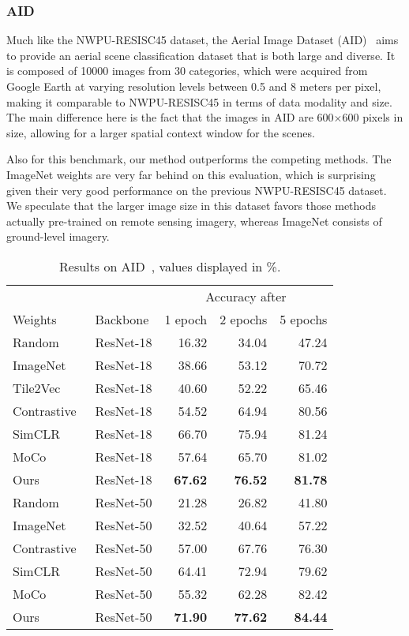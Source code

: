 \documentclass[journal]{IEEEtran}
\begin{document}
\subsubsection{AID}
Much like the NWPU-RESISC45 dataset,
the Aerial Image Dataset (AID)~\cite{xia_aid_2017} aims to provide an aerial scene classification dataset
that is both large and diverse.
It is composed of 10000 images from 30 categories,
which were acquired from Google Earth at varying resolution levels between 0.5 and 8 meters per pixel,
making it comparable to NWPU-RESISC45 in terms of data modality and size.
The main difference here is the fact that the images in AID are 600$\times$600 pixels in size,
allowing for a larger spatial context window for the scenes.

Also for this benchmark, our method outperforms the competing methods.
The ImageNet weights are very far behind on this evaluation,
which is surprising given their very good performance on the previous NWPU-RESISC45 dataset.
We speculate that the larger image size in this dataset
favors those methods actually pre-trained on remote sensing imagery,
whereas ImageNet consists of ground-level imagery.

\begin{table}
  \center
  \caption{
    Results on AID~\cite{xia_aid_2017}, values displayed in \%.
  }\label{table:aid}
  \begin{tabular}{llrrr}
    \toprule
    &&\multicolumn{3}{c}{Accuracy after}\\
    Weights&Backbone&1 epoch&2 epochs&5 epochs\\
    \midrule
    Random                        & ResNet-18 & 16.32 & 34.04 & 47.24 \\
    ImageNet                      & ResNet-18 & 38.66 & 53.12 & 70.72 \\
    Tile2Vec~\cite{tile2vec}      & ResNet-18 & 40.60 & 52.22 & 65.46 \\
    Contrastive~\cite{simclr}     & ResNet-18 & 54.52 & 64.94 & 80.56 \\
    SimCLR~\cite{simclr}          & ResNet-18 & 66.70 & 75.94 & 81.24 \\
    MoCo~\cite{he_momentum_2020}  & ResNet-18 & 57.64 & 65.70 & 81.02 \\
    Ours                          & ResNet-18 & \textbf{67.62} & \textbf{76.52} & \textbf{81.78} \\
    \midrule
    Random                        & ResNet-50 & 21.28 & 26.82 & 41.80 \\
    ImageNet                      & ResNet-50 & 32.52 & 40.64 & 57.22 \\
    Contrastive~\cite{simclr}     & ResNet-50 & 57.00 & 67.76 & 76.30 \\
    SimCLR~\cite{simclr}          & ResNet-50 & 64.41 & 72.94 & 79.62 \\
    MoCo~\cite{he_momentum_2020}  & ResNet-50 & 55.32 & 62.28 & 82.42 \\
    Ours                          & ResNet-50 & \textbf{71.90} & \textbf{77.62} & \textbf{84.44} \\
    \bottomrule
  \end{tabular}
\end{table}
 
\end{document}
